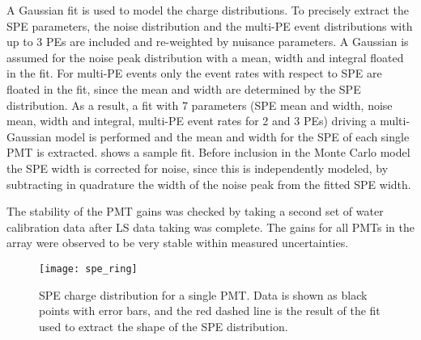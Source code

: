 A Gaussian fit is used to model the charge distributions. To precisely extract the SPE parameters, the noise distribution and the multi-PE event distributions with up to 3 PEs are included and re-weighted by nuisance parameters. A Gaussian is assumed for the noise peak distribution with a mean, width and integral floated in the fit. For multi-PE events only the event rates with respect to SPE are floated in the fit, since the mean and width are determined by the SPE distribution. As a result, a fit with 7 parameters (SPE mean and width, noise mean, width and integral, multi-PE event rates for 2 and 3 PEs) driving a multi-Gaussian model is performed and the mean and width for the SPE of each single PMT is extracted.   shows a sample fit. 
Before inclusion in the Monte Carlo model the SPE width is corrected for noise, since this is independently modeled, 
by subtracting in quadrature the width of the noise peak from the fitted SPE width.

The stability of the PMT gains was checked by taking a second set of water calibration data after LS data taking was complete.  The gains for all PMTs in the array were observed to be very stable within measured uncertainties.

\begin{figure}
	\centering
	\texttt{[image: spe\_ring]}
	\caption{SPE charge distribution for a single PMT. Data is shown as black points with error bars, and the red dashed line is the result of the fit used to extract the shape of the SPE distribution. }
	\label{fig:spe_data}
\end{figure}


